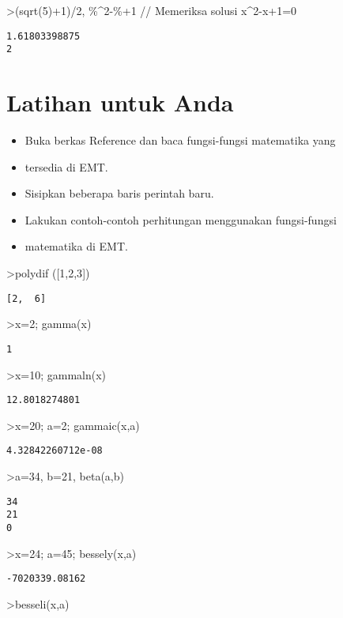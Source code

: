 \documentclass[
]{book}
\begin{document}
\textgreater(sqrt(5)+1)/2, \%\^{}2-\%+1 // Memeriksa solusi x\^{}2-x+1=0

\begin{verbatim}
1.61803398875
2
\end{verbatim}

\section{Latihan untuk Anda}\label{latihan-untuk-anda-1}

\begin{itemize}
\item
  Buka berkas Reference dan baca fungsi-fungsi matematika yang
\item
  tersedia di EMT.
\item
  Sisipkan beberapa baris perintah baru.
\item
  Lakukan contoh-contoh perhitungan menggunakan fungsi-fungsi
\item
  matematika di EMT.
\end{itemize}

\textgreater polydif ({[}1,2,3{]})

\begin{verbatim}
[2,  6]
\end{verbatim}

\textgreater x=2; gamma(x)

\begin{verbatim}
1
\end{verbatim}

\textgreater x=10; gammaln(x)

\begin{verbatim}
12.8018274801
\end{verbatim}

\textgreater x=20; a=2; gammaic(x,a)

\begin{verbatim}
4.32842260712e-08
\end{verbatim}

\textgreater a=34, b=21, beta(a,b)

\begin{verbatim}
34
21
0
\end{verbatim}

\textgreater x=24; a=45; bessely(x,a)

\begin{verbatim}
-7020339.08162
\end{verbatim}

\textgreater besseli(x,a)
\end{document}
